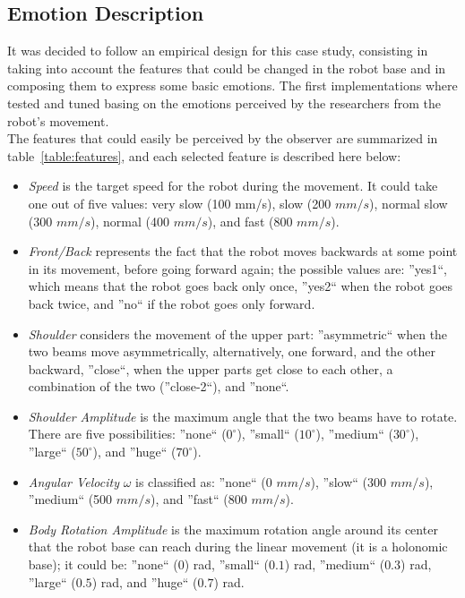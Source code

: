 \subsection{Emotion Description}
It was decided to follow an empirical design for this case study, consisting in taking into account the features that could be changed in the robot base and in composing them to express some basic emotions. The first implementations where tested and tuned basing on the emotions perceived by the researchers from the robot's movement.\\
The features that could easily be perceived by the observer are summarized in table~\ref{table:features}, and each selected feature is described here below:
\begin{itemize}
	\item \textit{Speed} is the target speed for the robot during the movement. It could take one out of five values: very slow (100 mm/s), slow (200 $mm/s$), normal slow (300 $mm/s$), normal (400 $mm/s$), and fast (800 $mm/s$).
	\item \textit{Front/Back} represents the fact that the robot moves backwards at some point in its movement, before going forward again; the possible values are: ''yes1``, which means that the robot goes back only once, ''yes2`` when the robot goes back twice, and ''no`` if the robot goes only forward.
	\item \textit{Shoulder} considers the movement of the upper part: ''asymmetric`` when the two beams move asymmetrically, alternatively, one forward, and the other backward, ''close``, when the upper parts get close to each other, a combination of the two (''close-2``), and ''none``. 
	\item \textit{Shoulder Amplitude} is the maximum angle that the two beams have to rotate. There are five possibilities: ''none`` ($0^\circ$), ''small`` ($10^\circ$), ''medium`` ($30^\circ$), ''large`` ($50^\circ$), and ''huge`` ($70^\circ$).
	\item \textit{Angular Velocity} $\omega$ is classified as: ''none`` (0 $mm/s$), ''slow`` (300 $mm/s$), ''medium`` (500 $mm/s$), and ''fast`` (800 $mm/s$).
	\item \textit{Body Rotation Amplitude} is the maximum  rotation angle around its center that the robot base can reach during the linear movement (it is a holonomic base); it could be: ''none`` ($0$) rad, ''small`` ($0.1$) rad, ''medium`` ($0.3$) rad, ''large`` ($0.5$) rad, and ''huge`` ($0.7$) rad.
\end{itemize}
